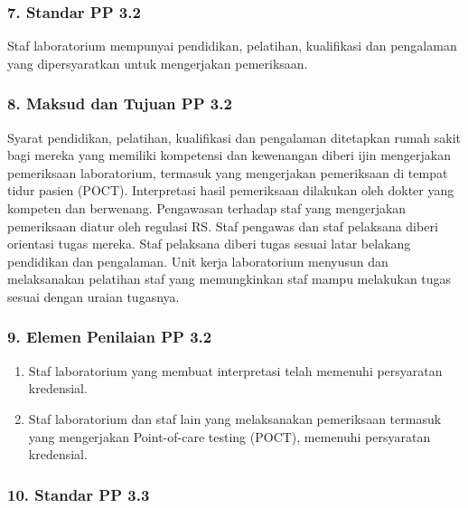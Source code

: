 \documentclass[
]{book}
\providecommand{\tightlist}{%
  \setlength{\itemsep}{0pt}\setlength{\parskip}{0pt}}
\begin{document}
\hypertarget{standar-pp-3.2}{%
\subsubsection*{7. Standar PP 3.2}\label{standar-pp-3.2}}

Staf laboratorium mempunyai pendidikan, pelatihan, kualifikasi dan pengalaman yang dipersyaratkan untuk mengerjakan pemeriksaan.

\hypertarget{maksud-dan-tujuan-pp-3.2}{%
\subsubsection*{8. Maksud dan Tujuan PP 3.2}\label{maksud-dan-tujuan-pp-3.2}}

Syarat pendidikan, pelatihan, kualifikasi dan pengalaman ditetapkan rumah sakit bagi mereka yang memiliki kompetensi dan kewenangan diberi ijin mengerjakan pemeriksaan laboratorium, termasuk yang mengerjakan pemeriksaan di tempat tidur pasien (POCT). Interpretasi hasil pemeriksaan dilakukan oleh dokter yang kompeten dan berwenang. Pengawasan terhadap staf yang mengerjakan pemeriksaan diatur oleh regulasi RS. Staf pengawas dan staf pelaksana diberi orientasi tugas mereka. Staf pelaksana diberi tugas sesuai latar belakang pendidikan dan pengalaman. Unit kerja laboratorium menyusun dan melaksanakan pelatihan staf yang memungkinkan staf mampu melakukan tugas sesuai dengan uraian tugasnya.

\hypertarget{elemen-penilaian-pp-3.2}{%
\subsubsection{9. Elemen Penilaian PP 3.2}\label{elemen-penilaian-pp-3.2}}

\begin{enumerate}
\def\labelenumi{\alph{enumi}.}
\tightlist
\item
  Staf laboratorium yang membuat interpretasi telah memenuhi persyaratan kredensial.
\item
  Staf laboratorium dan staf lain yang melaksanakan pemeriksaan termasuk yang mengerjakan Point-of-care testing (POCT), memenuhi persyaratan kredensial.
\end{enumerate}

\hypertarget{standar-pp-3.3}{%
\subsubsection*{10. Standar PP 3.3}\label{standar-pp-3.3}}
\end{document}

